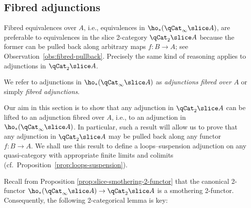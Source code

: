 \subsection{Fibred adjunctions}\label{subsec:fibred.adjunction}

Fibred equivalences over $A$, i.e., equivalences in $\ho_*(\qCat_\infty\slice  A)$, are preferable to equivalences in the slice 2-category $\qCat_2\slice  A$ because the former can be pulled back along arbitrary maps $f \colon B \to A$; see Observation~\ref{obs:fibred-pullback}. Precisely the same kind of reasoning applies to adjunctions in $\qCat_2\slice  A$. 

\begin{defn}\label{defn:fibred.adj}
  We refer to adjunctions in $\ho_*(\qCat_\infty\slice A)$ as \emph{adjunctions fibred over $A$} or simply \emph{fibred adjunctions}.
\end{defn}

    Our aim in this section is to show that any adjunction in $\qCat_2\slice A$ can  be lifted to an adjunction fibred over $A$, i.e., to an adjunction in $\ho_*(\qCat_\infty\slice A)$. In particular, such a result will allow us to prove that any adjunction in $\qCat_2\slice  A$ may be pulled back along any functor $f\colon B\to A$. We shall use this result to define a loops--suspension adjunction on any quasi-category with appropriate finite limits and colimits (cf.\ Proposition~\ref{prop:loops-suspension}).

    Recall from Proposition \ref{prop:slice-smothering-2-functor} that the canonical 2-functor $\ho_*(\qCat_\infty\slice A) \to \qCat_2\slice A$ is a smothering 2-functor. Consequently, the following 2-categorical lemma is key:

